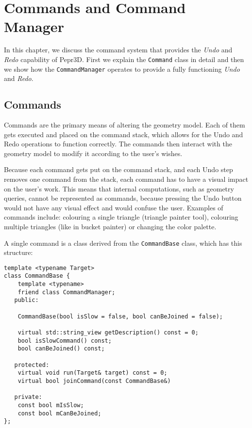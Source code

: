 \chapter{Commands and Command Manager}
\label{ch:commands}

In this chapter, we discuss the command system that provides the \textit{Undo} and \textit{Redo} capability of Pepr3D. First we explain the \texttt{Command} class in detail and then we show how the \texttt{CommandManager} operates to provide a fully functioning \textit{Undo} and \textit{Redo}.

\section{Commands}

Commands are the primary means of altering the geometry model. Each of them gets executed and placed on the command stack, which allows for the Undo and Redo operations to function correctly. The commands then interact with the geometry model to modify it according to the user's wishes.

Because each command gets put on the command stack, and each Undo step removes one command from the stack, each command has to have a visual impact on the user's work. This means that internal computations, such as geometry queries, cannot be represented as commands, because pressing the Undo button would not have any visual effect and would confuse the user. Examples of commands include: colouring a single triangle (triangle painter tool), colouring multiple triangles (like in bucket painter) or changing the color palette.

A single command is a class derived from the \texttt{CommandBase} class, which has this structure:

\begin{lstlisting}
template <typename Target>
class CommandBase {
    template <typename>
    friend class CommandManager;
   public:

    CommandBase(bool isSlow = false, bool canBeJoined = false);

    virtual std::string_view getDescription() const = 0;
    bool isSlowCommand() const;
    bool canBeJoined() const;

   protected:
    virtual void run(Target& target) const = 0;
    virtual bool joinCommand(const CommandBase&)

   private:
    const bool mIsSlow;
    const bool mCanBeJoined;
};
\end{lstlisting}

